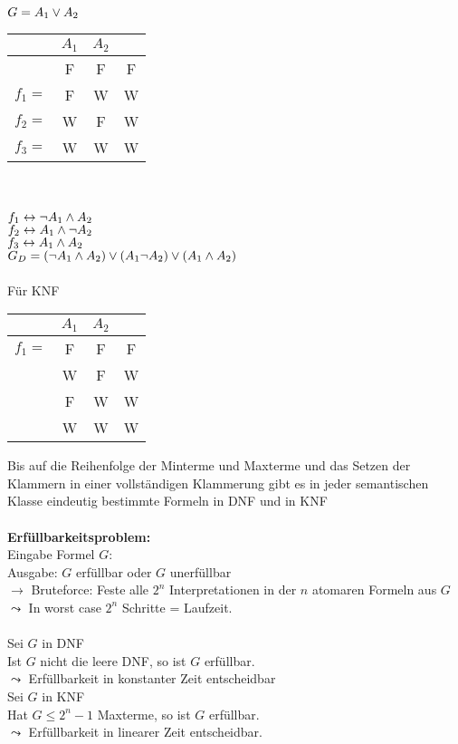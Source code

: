 \beispiel{}
$G = A_1 \vee A_2$\\
\begin{tabular}{lc|c|c}
  & $A_1$ & $A_2$ &  \\
\hline
 & F & F & F \\
$f_1=$ & F & W & W \\
$f_2=$ & W & F & W \\
$f_3=$ & W & W & W \\
\end{tabular}\\
\noindent\\
$f_1 \leftrightarrow \neg A_1 \wedge A_2$\\
$f_2 \leftrightarrow A_1 \wedge \neg A_2$\\
$f_3 \leftrightarrow A_1 \wedge A_2$\\
$G_D = ( \neg A_1 \wedge A_2 ) \vee (A_1 \neg A_2) \vee ( A_1 \wedge A_2)$\\
\noindent\\
Für KNF\\
\begin{tabular}{lc|c|c}
  & $A_1$ & $A_2$ &  \\
\hline
$f_1=$ & F & F & F \\
 & W & F & W \\
 & F & W & W \\
 & W & W & W \\
\end{tabular}

Bis auf die Reihenfolge der Minterme und Maxterme und das Setzen der Klammern in einer vollständigen Klammerung gibt es in jeder semantischen Klasse eindeutig bestimmte Formeln in DNF und in KNF\\

\noindent\\
\textbf{Erfüllbarkeitsproblem:}\\
Eingabe Formel $G$:\\
Ausgabe: $G$ erfüllbar oder $G$ unerfüllbar \\
$\rightarrow$ Bruteforce: Feste alle $2^n$ Interpretationen in der $n$ atomaren Formeln aus $G$ \\
$\leadsto$ In worst case $2^n$ Schritte = Laufzeit.\\

\noindent\\
Sei $G$ in DNF\\
Ist $G$ nicht die leere DNF, so ist $G$ erfüllbar.\\
$\leadsto$ Erfüllbarkeit in konstanter Zeit entscheidbar\\

\noindent
Sei $G$ in KNF\\
Hat $G \leq 2^n -1$ Maxterme, so ist $G$ erfüllbar.\\
$\leadsto$ Erfüllbarkeit in linearer Zeit entscheidbar.